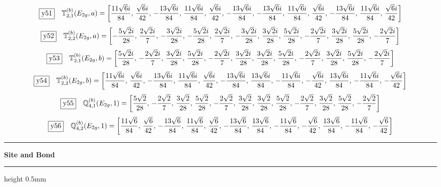 \documentclass[fleqn,10pt,landscape]{jsarticle}
\begin{document}
\begin{dmath*}
\fbox{y51}\quad \mathbb{T}_{2,1}^{(b)}(E_{2g},a)=\left[ \frac{11 \sqrt{6} i}{84},\, \frac{\sqrt{6} i}{42},\, - \frac{13 \sqrt{6} i}{84},\, \frac{11 \sqrt{6} i}{84},\, \frac{\sqrt{6} i}{42},\, - \frac{13 \sqrt{6} i}{84},\, - \frac{13 \sqrt{6} i}{84},\, \frac{11 \sqrt{6} i}{84},\, \frac{\sqrt{6} i}{42},\, - \frac{13 \sqrt{6} i}{84},\, \frac{11 \sqrt{6} i}{84},\, \frac{\sqrt{6} i}{42} \right]
\end{dmath*}
\begin{dmath*}
\fbox{y52}\quad \mathbb{T}_{2,2}^{(b)}(E_{2g},a)=\left[ - \frac{5 \sqrt{2} i}{28},\, \frac{2 \sqrt{2} i}{7},\, - \frac{3 \sqrt{2} i}{28},\, - \frac{5 \sqrt{2} i}{28},\, \frac{2 \sqrt{2} i}{7},\, - \frac{3 \sqrt{2} i}{28},\, \frac{3 \sqrt{2} i}{28},\, \frac{5 \sqrt{2} i}{28},\, - \frac{2 \sqrt{2} i}{7},\, \frac{3 \sqrt{2} i}{28},\, \frac{5 \sqrt{2} i}{28},\, - \frac{2 \sqrt{2} i}{7} \right]
\end{dmath*}
\begin{dmath*}
\fbox{y53}\quad \mathbb{T}_{2,1}^{(b)}(E_{2g},b)=\left[ \frac{5 \sqrt{2} i}{28},\, - \frac{2 \sqrt{2} i}{7},\, \frac{3 \sqrt{2} i}{28},\, \frac{5 \sqrt{2} i}{28},\, - \frac{2 \sqrt{2} i}{7},\, \frac{3 \sqrt{2} i}{28},\, \frac{3 \sqrt{2} i}{28},\, \frac{5 \sqrt{2} i}{28},\, - \frac{2 \sqrt{2} i}{7},\, \frac{3 \sqrt{2} i}{28},\, \frac{5 \sqrt{2} i}{28},\, - \frac{2 \sqrt{2} i}{7} \right]
\end{dmath*}
\begin{dmath*}
\fbox{y54}\quad \mathbb{T}_{2,2}^{(b)}(E_{2g},b)=\left[ \frac{11 \sqrt{6} i}{84},\, \frac{\sqrt{6} i}{42},\, - \frac{13 \sqrt{6} i}{84},\, \frac{11 \sqrt{6} i}{84},\, \frac{\sqrt{6} i}{42},\, - \frac{13 \sqrt{6} i}{84},\, \frac{13 \sqrt{6} i}{84},\, - \frac{11 \sqrt{6} i}{84},\, - \frac{\sqrt{6} i}{42},\, \frac{13 \sqrt{6} i}{84},\, - \frac{11 \sqrt{6} i}{84},\, - \frac{\sqrt{6} i}{42} \right]
\end{dmath*}
\begin{dmath*}
\fbox{y55}\quad \mathbb{Q}_{4,1}^{(b)}(E_{2g},1)=\left[ \frac{5 \sqrt{2}}{28},\, - \frac{2 \sqrt{2}}{7},\, \frac{3 \sqrt{2}}{28},\, \frac{5 \sqrt{2}}{28},\, - \frac{2 \sqrt{2}}{7},\, \frac{3 \sqrt{2}}{28},\, \frac{3 \sqrt{2}}{28},\, \frac{5 \sqrt{2}}{28},\, - \frac{2 \sqrt{2}}{7},\, \frac{3 \sqrt{2}}{28},\, \frac{5 \sqrt{2}}{28},\, - \frac{2 \sqrt{2}}{7} \right]
\end{dmath*}
\begin{dmath*}
\fbox{y56}\quad \mathbb{Q}_{4,2}^{(b)}(E_{2g},1)=\left[ \frac{11 \sqrt{6}}{84},\, \frac{\sqrt{6}}{42},\, - \frac{13 \sqrt{6}}{84},\, \frac{11 \sqrt{6}}{84},\, \frac{\sqrt{6}}{42},\, - \frac{13 \sqrt{6}}{84},\, \frac{13 \sqrt{6}}{84},\, - \frac{11 \sqrt{6}}{84},\, - \frac{\sqrt{6}}{42},\, \frac{13 \sqrt{6}}{84},\, - \frac{11 \sqrt{6}}{84},\, - \frac{\sqrt{6}}{42} \right]
\end{dmath*}
\vspace{5mm}
\noindent \rule[0.5mm]{5mm}{0.5mm}\hspace{3mm}\textbf{Site and Bond}\hspace{3mm}\leaders\hrule height 0.5mm\hfill\kern0pt
\vspace{3mm}
\end{document}
